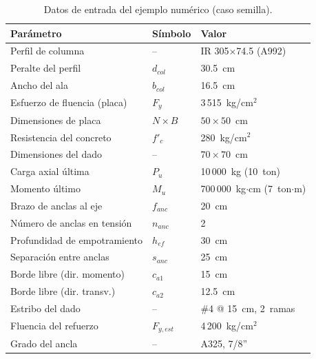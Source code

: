 \begin{table}[H]
  \centering
  \caption{Datos de entrada del ejemplo numérico (caso semilla).}
  \label{tab:ejemplo_entrada}
  \begingroup
  \fontsize{10pt}{12pt}\selectfont
  \setlength{\tabcolsep}{4pt}
  \renewcommand{\arraystretch}{1.05}
  \begin{tabular}{p{} p{} p{}}
    \toprule
    \textbf{Parámetro} & \textbf{Símbolo} & \textbf{Valor} \\
    \midrule
    Perfil de columna           & --          & IR 305$\times$74.5 (A992) \\
    Peralte del perfil          & $d_{col}$   & 30.5~cm \\
    Ancho del ala               & $b_{col}$   & 16.5~cm \\
    Esfuerzo de fluencia (placa)& $F_y$       & 3\,515~kg/cm$^2$ \\
    Dimensiones de placa        & $N\times B$ & $50\times50$~cm \\
    Resistencia del concreto    & $f'_c$      & 280~kg/cm$^2$ \\
    Dimensiones del dado        & --          & $70\times70$~cm \\
    Carga axial última          & $P_u$       & 10\,000~kg (10~ton) \\
    Momento último              & $M_u$       & 700\,000~kg$\cdot$cm (7~ton$\cdot$m) \\
    Brazo de anclas al eje      & $f_{anc}$   & 20~cm \\
    Número de anclas en tensión & $n_{anc}$   & 2 \\
    Profundidad de empotramiento& $h_{ef}$    & 30~cm \\
    Separación entre anclas     & $s_{anc}$   & 25~cm \\
    Borde libre (dir. momento)  & $c_{a1}$    & 15~cm \\
    Borde libre (dir. transv.)  & $c_{a2}$    & 12.5~cm \\
    Estribo del dado            & --          & \#4 @ 15~cm, 2~ramas \\
    Fluencia del refuerzo       & $F_{y,est}$ & 4\,200~kg/cm$^2$ \\
    Grado del ancla             & --          & A325, 7/8'' \\
    \bottomrule
  \end{tabular}
  \endgroup
\end{table}

